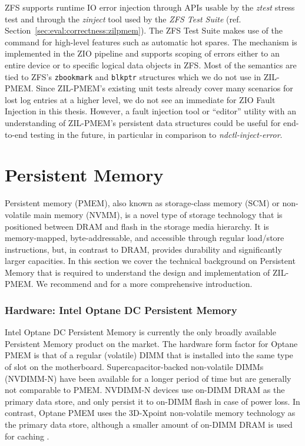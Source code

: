 \documentclass[12pt,a4paper,twoside]{book}
\begin{document}
ZFS supports runtime IO error injection through APIs usable by the \textit{ztest} stress test and through the \textit{zinject} tool used by the \textit{ZFS Test Suite} (ref. Section~\ref{sec:eval:correctness:zilpmem}).
The ZFS Test Suite makes use of the command for high-level features such as automatic hot spares.
The mechanism is implemented in the ZIO pipeline and supports scoping of errors either to an entire device or to specific logical data objects in ZFS.
Most of the semantics are tied to ZFS’s \lstinline{zbookmark} and \lstinline{blkptr} structures which we do not use in ZIL-PMEM.
Since ZIL-PMEM's existing unit tests already cover many scenarios for lost log entries at a higher level, we do not see an immediate for ZIO Fault Injection in this thesis.
However, a fault injection tool or ``editor'' utility with an understanding of ZIL-PMEM's persistent data structures could be useful for end-to-end testing in the future, in particular in comparison to \textit{ndctl-inject-error}.

\section{Persistent Memory}
Persistent memory (PMEM), also known as storage-class memory (SCM) or non-volatile main memory (NVMM), is a novel type of storage technology that is positioned between DRAM and flash in the storage media hierarchy.
It is memory-mapped, byte-addressable, and accessible through regular load/store instructions, but, in contrast to DRAM, provides durability and significantly larger capacities.
In this section we cover the technical background on Persistent Memory that is required to understand the design and implementation of ZIL-PMEM.
We recommend \cite{rudoffPersistentMemoryProgramming2017} and \cite{Scargall2020} for a more comprehensive introduction.

\subsubsection{Hardware: Intel Optane DC Persistent Memory}
Intel Optane DC Persistent Memory is currently the only broadly available Persistent Memory product on the market.
The hardware form factor for Optane PMEM is that of a regular (volatile) DIMM that is installed into the same type of slot on the motherboard.
Supercapacitor-backed non-volatile DIMMs (NVDIMM-N) have been available for a longer period of time but are generally not comparable to PMEM.
NVDIMM-N devices use on-DIMM DRAM as the primary data store, and only persist it to on-DIMM flash in case of power loss.
In contrast, Optane PMEM uses the 3D-Xpoint non-volatile memory technology as the primary data store, although a smaller amount of on-DIMM DRAM is used for caching \cite{yangEmpiricalGuideBehavior2020}.
\end{document}
